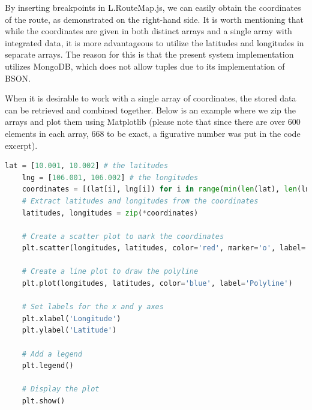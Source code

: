 By inserting breakpoints in L.RouteMap.js, we can easily obtain the coordinates of the route, as demonstrated on the right-hand side. It is worth mentioning that while the coordinates are given in both distinct arrays and a single array with integrated data, it is more advantageous to utilize the latitudes and longitudes in separate arrays. The reason for this is that the present system implementation utilizes MongoDB, which does not allow tuples due to its implementation of BSON.

When it is desirable to work with a single array of coordinates, the stored data can be retrieved and combined together. Below is an example where we zip the arrays and plot them using Matplotlib (please note that since there are over 600 elements in each array, 668 to be exact, a figurative number was put in the code excerpt).

\begin{lstlisting}[language=python]
    lat = [10.001, 10.002] # the latitudes
    lng = [106.001, 106.002] # the longitudes
    coordinates = [(lat[i], lng[i]) for i in range(min(len(lat), len(lng)))]
    # Extract latitudes and longitudes from the coordinates
    latitudes, longitudes = zip(*coordinates)
    
    # Create a scatter plot to mark the coordinates
    plt.scatter(longitudes, latitudes, color='red', marker='o', label='Coordinates')
    
    # Create a line plot to draw the polyline
    plt.plot(longitudes, latitudes, color='blue', label='Polyline')
    
    # Set labels for the x and y axes
    plt.xlabel('Longitude')
    plt.ylabel('Latitude')
    
    # Add a legend
    plt.legend()
    
    # Display the plot
    plt.show()
\end{lstlisting}

